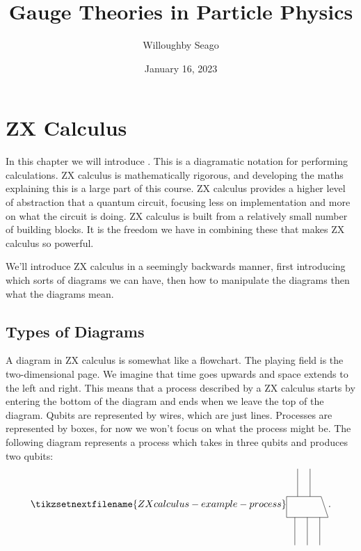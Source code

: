 \documentclass[fleqn]{NotesClass}
\title{Gauge Theories in Particle Physics}
\author{Willoughby Seago}
\date{January 16, 2023}
\begin{document}
    \frontmatter
    \titlepage
    \innertitlepage{}
    \tableofcontents
    \listoffigures
    \mainmatter
    
    \chapter{ZX Calculus}
    In this chapter we will introduce .
    This is a diagramatic notation for performing calculations.
    ZX calculus is mathematically rigorous, and developing the maths explaining this is a large part of this course.
    ZX calculus provides a higher level of abstraction that a quantum circuit, focusing less on implementation and more on what the circuit is doing.
    ZX calculus is built from a relatively small number of building blocks.
    It is the freedom we have in combining these that makes ZX calculus so powerful.
    
    We'll introduce ZX calculus in a seemingly backwards manner, first introducing which sorts of diagrams we can have, then how to manipulate the diagrams then what the diagrams mean.
    
    \section{Types of Diagrams}
    A diagram in ZX calculus is somewhat like a flowchart.
    The playing field is the two-dimensional page.
    We imagine that time goes upwards and space extends to the left and right.
    This means that a process described by a ZX calculus starts by entering the bottom of the diagram and ends when we leave the top of the diagram.
    Qubits are represented by wires, which are just lines.
    Processes are represented by boxes, for now we won't focus on what the process might be.
    The following diagram represents a process which takes in three qubits and produces two qubits:
    \begin{equation}
        \tikzsetnextfilename{ZXcalculus-example-process}
        \begin{tikzpicture}[baseline=(current bounding box)]
            \draw (0, 0) -- ++ (1.5, 0) -- ++ (-0.25, 0.75) -- ++ (-1.25, 0) -- cycle;
            \draw (0.3, 0) -- ++ (0, -1);
            \draw (0.75, 0) -- ++ (0, -1);
            \draw (1.2, 0) -- ++ (0, -1);
            \draw (0.4, 0.75) -- ++ (0, 1);
            \draw (0.85, 0.75) -- ++ (0, 1);
        \end{tikzpicture}
        .
    \end{equation}
    
\end{document}
